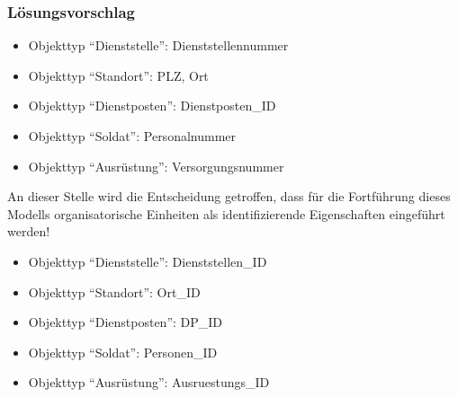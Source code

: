         \subsubsection{Lösungsvorschlag}
          \begin{itemize}
            \item Objekttyp \enquote{Dienststelle}: Dienststellennummer
            \item Objekttyp \enquote{Standort}: PLZ, Ort
            \item Objekttyp \enquote{Dienstposten}: Dienstposten\_ID
            \item Objekttyp \enquote{Soldat}: Personalnummer
            \item Objekttyp \enquote{Ausrüstung}: Versorgungsnummer
          \end{itemize}
          An dieser Stelle wird die Entscheidung getroffen, dass für die Fortführung dieses Modells organisatorische Einheiten als identifizierende Eigenschaften eingeführt werden!
          \begin{itemize}
            \item Objekttyp \enquote{Dienststelle}: Dienststellen\_ID
            \item Objekttyp \enquote{Standort}: Ort\_ID
            \item Objekttyp \enquote{Dienstposten}: DP\_ID
            \item Objekttyp \enquote{Soldat}: Personen\_ID
            \item Objekttyp \enquote{Ausrüstung}: Ausruestungs\_ID
          \end{itemize}


